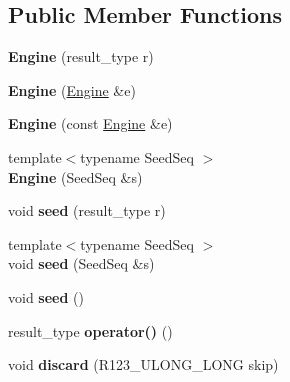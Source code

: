 \subsection*{Public Member Functions}
\begin{DoxyCompactItemize}
\item 
\hypertarget{structr123_1_1Engine_ae1a249af828cfdac77db6c16e3f8f8eb}{}\label{structr123_1_1Engine_ae1a249af828cfdac77db6c16e3f8f8eb} 
{\bfseries Engine} (result\+\_\+type r)
\item 
\hypertarget{structr123_1_1Engine_a37dd55cee849b59d678f74780f785672}{}\label{structr123_1_1Engine_a37dd55cee849b59d678f74780f785672} 
{\bfseries Engine} (\hyperlink{structr123_1_1Engine}{Engine} \&e)
\item 
\hypertarget{structr123_1_1Engine_a478b486b166316597a51ffdd7b5b2d0c}{}\label{structr123_1_1Engine_a478b486b166316597a51ffdd7b5b2d0c} 
{\bfseries Engine} (const \hyperlink{structr123_1_1Engine}{Engine} \&e)
\item 
\hypertarget{structr123_1_1Engine_abd535170be11324a31b5657c2465d388}{}\label{structr123_1_1Engine_abd535170be11324a31b5657c2465d388} 
{\footnotesize template$<$typename Seed\+Seq $>$ }\\{\bfseries Engine} (Seed\+Seq \&s)
\item 
\hypertarget{structr123_1_1Engine_a93429593bdb12b202b4b8ed38fe08bc4}{}\label{structr123_1_1Engine_a93429593bdb12b202b4b8ed38fe08bc4} 
void {\bfseries seed} (result\+\_\+type r)
\item 
\hypertarget{structr123_1_1Engine_aac89ba287bdb118699c8eb8483c2c52a}{}\label{structr123_1_1Engine_aac89ba287bdb118699c8eb8483c2c52a} 
{\footnotesize template$<$typename Seed\+Seq $>$ }\\void {\bfseries seed} (Seed\+Seq \&s)
\item 
\hypertarget{structr123_1_1Engine_aff36bc97d11bc66f6c0edb75d8dc88e5}{}\label{structr123_1_1Engine_aff36bc97d11bc66f6c0edb75d8dc88e5} 
void {\bfseries seed} ()
\item 
\hypertarget{structr123_1_1Engine_aca309d0b4f2a8fff1f6f2ab38c6caf93}{}\label{structr123_1_1Engine_aca309d0b4f2a8fff1f6f2ab38c6caf93} 
result\+\_\+type {\bfseries operator()} ()
\item 
\hypertarget{structr123_1_1Engine_a3166cda5ff3d602244aef5dc96d489a4}{}\label{structr123_1_1Engine_a3166cda5ff3d602244aef5dc96d489a4} 
void {\bfseries discard} (R123\+\_\+\+U\+L\+O\+N\+G\+\_\+\+L\+O\+NG skip)
\item 
\hypertarget{structr123_1_1Engine_ab5f45b4eb97995cc45350abee3ec8388}{}\label{structr123_1_1Engine_ab5f45b4eb97995cc45350abee3ec8388} 

\end{DoxyCompactItemize}
